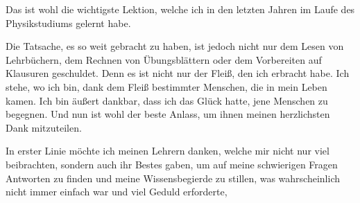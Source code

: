 \noindent Das ist wohl die wichtigste Lektion, welche ich in den letzten Jahren im Laufe des Physikstudiums gelernt habe.

\noindent Die Tatsache, es so weit gebracht zu haben, ist jedoch nicht nur dem Lesen von Lehrbüchern, dem Rechnen von Übungsblättern oder dem Vorbereiten auf Klausuren geschuldet. Denn es ist nicht nur der Fleiß, den ich erbracht habe.
Ich stehe, wo ich bin, dank dem Fleiß bestimmter Menschen, die in mein Leben kamen. Ich bin äußert dankbar, dass ich das Glück hatte, jene Menschen zu begegnen. Und nun ist wohl der beste Anlass, um ihnen meinen herzlichsten Dank mitzuteilen.

\noindent In erster Linie möchte ich meinen Lehrern danken, welche mir nicht nur viel beibrachten, sondern auch ihr Bestes gaben, um auf meine schwierigen Fragen Antworten zu finden und meine Wissensbegierde zu stillen, was wahrscheinlich nicht immer einfach war und viel Geduld erforderte,


